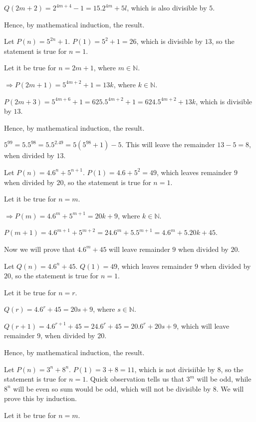   $Q(2m + 2) = 2^{4m + 4} - 1 = 15.2^{4m} + 5l$, which is also divisible by $5$.

  Hence, by mathematical induction, the result.
\item Let $P(n) = 5^{2n} + 1$. $P(1) = 5^2 + 1 = 26$, which is divisible by $13$, so the statement is true
  for $n = 1$.

  Let it be true for $n = 2m + 1$, where $m\in\mathbb{N}$.

  $\Rightarrow P(2m + 1) = 5^{4m + 2} + 1 = 13k$, where $k\in\mathbb{N}$.

  $P(2m + 3) = 5^{4m + 6} + 1 = 625.5^{4m + 2} + 1 = 624.5^{4m + 2} + 13k$, which is divisible by $13$.

  Hence, by mathematical induction, the result.

  $5^{99} = 5.5^{98} = 5.5^{2.49} = 5(5^{98} + 1) - 5$. This will leave the remainder $13 - 5 = 8$, when
  divided by $13$.
\item Let $P(n) = 4.6^n + 5^{n + 1}$. $P(1) = 4.6 + 5^2 = 49$, which leaves remainder $9$ when divided by
  $20$, so the statement is true for $n = 1$.

  Let it be true for $n = m$.

  $\Rightarrow P(m) = 4.6^m + 5^{m + 1} = 20k + 9$, where $k\in\mathbb{N}$.

  $P(m + 1) = 4.6^{m + 1} + 5^{m + 2} = 24.6^m + 5.5^{m + 1} = 4.6^m + 5.20k + 45$.

  Now we will prove that $4.6^m + 45$ will leave remainder $9$ when divided by $20$.

  Let $Q(n) = 4.6^n + 45$. $Q(1) = 49$, which leaves remainder $9$ when divided by $20$, so the statement is
  true for $n = 1$.

  Let it be true for $n = r$.

  $Q(r) = 4.6^r + 45 = 20s + 9$, where $s\in\mathbb{N}$.

  $Q(r + 1) = 4.6^{r + 1} + 45 = 24.6^r + 45 = 20.6^r + 20s + 9$, which will leave remainder $9$, when
  divided by $20$.

  Hence, by mathematical induction, the result.
\item Let $P(n) = 3^n + 8^n$. $P(1) = 3 + 8 = 11$, which is not divisiible by $8$, so the statement is true
  for $n = 1$. Quick observation tells us that $3^m$ will be odd, while $8^n$ will be even so sum would be
  odd, which will not be divisible by $8$. We will prove this by induction.

  Let it be true for $n = m$.

